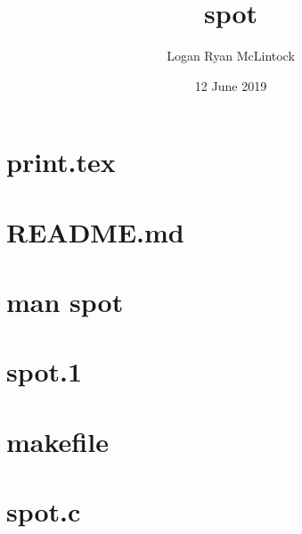 \documentclass[titlepage, a4paper]{article}
\title{spot}
\date {12 June 2019}
\author{Logan Ryan McLintock}
\begin{document}
\maketitle

\tableofcontents
\newpage

\section{print.tex}
\newpage

\section{README.md}
\newpage

\section{man spot}


\section{spot.1}
\newpage

\section{makefile}
\newpage

\section{spot.c}
\end{document}
